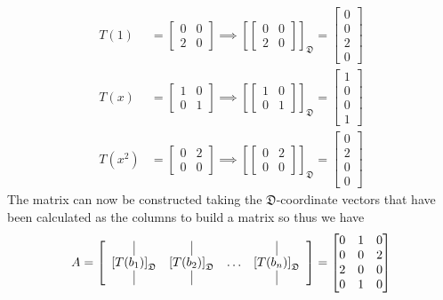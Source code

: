 \documentclass{report}
\begin{document}
$$
\begin{aligned}
T(1) & = \begin{bmatrix} 0 & 0 \\ 2 & 0 \end{bmatrix} \implies \left[\begin{bmatrix} 0 & 0 \\ 2 & 0 \end{bmatrix}\right]_{\mathfrak{D}} = \begin{bmatrix} 0 \\ 0 \\ 2 \\ 0 \end{bmatrix}\\ 
T(x) & = \begin{bmatrix} 1 & 0 \\ 0 & 1 \end{bmatrix} \implies \left[\begin{bmatrix} 1 & 0 \\ 0 & 1 \end{bmatrix}\right]_{\mathfrak{D}} = \begin{bmatrix} 1 \\ 0 \\ 0 \\ 1 \end{bmatrix}\\
T(x^2) & = \begin{bmatrix} 0 & 2 \\ 0 & 0 \end{bmatrix} \implies \left[\begin{bmatrix} 0 & 2 \\ 0 & 0 \end{bmatrix}\right]_{\mathfrak{D}} = \begin{bmatrix} 0 \\ 2 \\ 0 \\ 0 \end{bmatrix}
\end{aligned}
$$
The matrix can now be constructed taking the $\mathfrak{D}$-coordinate vectors that have been calculated as the columns to build a matrix so thus we have
$$
A = \left[
  \begin{array}{cccc}
    \vrule & \vrule & & \vrule\\
    \left[T(b_{1})\right]_{\mathfrak{D}} & \left[T(b_{2})\right]_{\mathfrak{D}} & \ldots & \left[T(b_{n})\right]_{\mathfrak{D}} \\
    \vrule & \vrule & & \vrule 
  \end{array}
\right] =
\begin{bmatrix}
0 & 1 & 0 \\
0 & 0 & 2 \\
2 & 0 & 0 \\
0 & 1 & 0
\end{bmatrix}
$$
\end{document}
